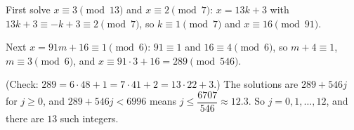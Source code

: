 First solve $x\equiv3\pmod{13}$ and $x\equiv2\pmod7$: $x=13k+3$ with $13k+3\equiv-k+3\equiv2\pmod7$, so $k\equiv1\pmod 7$ and $x\equiv16\pmod{91}$.

Next $x=91m+16\equiv1\pmod6$: $91\equiv1$ and $16\equiv4\pmod6$, so $m+4\equiv1$, $m\equiv3\pmod6$, and $x\equiv91\cdot3+16=289\pmod{546}$.

(Check: $289=6\cdot48+1=7\cdot41+2=13\cdot22+3$.) The solutions are $289+546j$ for $j\ge0$, and $289+546j<6996$ means $j\le\dfrac{6707}{546}\approx12.3$. So $j=0,1,\ldots,12$, and there are $\boxed{13}$ such integers.
